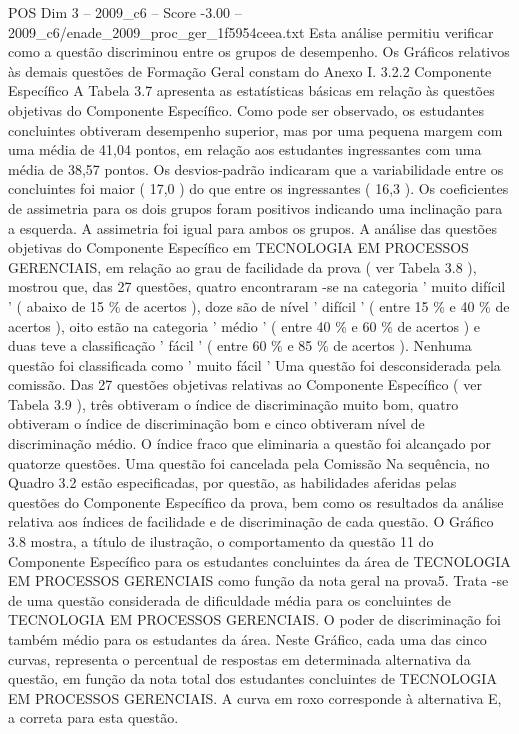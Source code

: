 \begin{textsample}{POS Dim 3 – 2009\_c6 – Score -3.00 – 2009\_c6/enade\_2009\_proc\_ger\_1f5954ceea.txt}
Esta análise permitiu verificar como a questão discriminou entre os grupos de desempenho.
Os Gráficos relativos às demais questões de Formação Geral constam do Anexo I. 3.2.2 Componente Específico A Tabela 3.7 apresenta as estatísticas básicas em relação às questões objetivas do Componente Específico.
Como pode ser observado, os estudantes concluintes obtiveram desempenho superior, mas por uma pequena margem com uma média de 41,04 pontos, em relação aos estudantes ingressantes com uma média de 38,57 pontos.
Os desvios-padrão indicaram que a variabilidade entre os concluintes foi maior ( 17,0 ) do que entre os ingressantes ( 16,3 ).
Os coeficientes de assimetria para os dois grupos foram positivos indicando uma inclinação para a esquerda.
A assimetria foi igual para ambos os grupos.
A análise das questões objetivas do Componente Específico em TECNOLOGIA EM PROCESSOS GERENCIAIS, em relação ao grau de facilidade da prova ( ver Tabela 3.8 ), mostrou que, das 27 questões, quatro encontraram -se na categoria ' muito difícil ' ( abaixo de 15 \% de acertos ), doze são de nível ' difícil ' ( entre 15 \% e 40 \% de acertos ), oito estão na categoria ' médio ' ( entre 40 \% e 60 \% de acertos ) e duas teve a classificação ' fácil ' ( entre 60 \% e 85 \% de acertos ).
Nenhuma questão foi classificada como ' muito fácil ' Uma questão foi desconsiderada pela comissão.
Das 27 questões objetivas relativas ao Componente Específico ( ver Tabela 3.9 ), três obtiveram o índice de discriminação muito bom, quatro obtiveram o índice de discriminação bom e cinco obtiveram nível de discriminação médio.
O índice fraco que eliminaria a questão foi alcançado por quatorze questões.
Uma questão foi cancelada pela Comissão Na sequência, no Quadro 3.2 estão especificadas, por questão, as habilidades aferidas pelas questões do Componente Específico da prova, bem como os resultados da análise relativa aos índices de facilidade e de discriminação de cada questão.
O Gráfico 3.8 mostra, a título de ilustração, o comportamento da questão 11 do Componente Específico para os estudantes concluintes da área de TECNOLOGIA EM PROCESSOS GERENCIAIS como função da nota geral na prova5.
Trata -se de uma questão considerada de dificuldade média para os concluintes de TECNOLOGIA EM PROCESSOS GERENCIAIS.
O poder de discriminação foi também médio para os estudantes da área.
Neste Gráfico, cada uma das cinco curvas, representa o percentual de respostas em determinada alternativa da questão, em função da nota total dos estudantes concluintes de TECNOLOGIA EM PROCESSOS GERENCIAIS.
A curva em roxo corresponde à alternativa E, a correta para esta questão.

\end{textsample}

